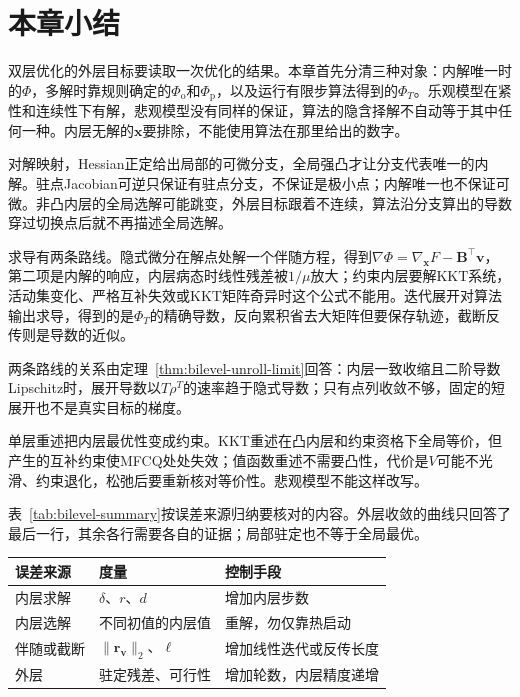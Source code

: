 \section{本章小结}
\label{sec:bilevel-summary}

双层优化的外层目标要读取一次优化的结果。本章首先分清三种对象：内解唯一时的$\Phi$，多解时靠规则确定的$\Phi_{\mathrm{o}}$和$\Phi_{\mathrm{p}}$，以及运行有限步算法得到的$\Phi_T$。乐观模型在紧性和连续性下有解，悲观模型没有同样的保证，算法的隐含择解不自动等于其中任何一种。内层无解的$\bm{x}$要排除，不能使用算法在那里给出的数字。

对解映射，Hessian正定给出局部的可微分支，全局强凸才让分支代表唯一的内解。驻点Jacobian可逆只保证有驻点分支，不保证是极小点；内解唯一也不保证可微。非凸内层的全局选解可能跳变，外层目标跟着不连续，算法沿分支算出的导数穿过切换点后就不再描述全局选解。

求导有两条路线。隐式微分在解点处解一个伴随方程，得到$\nabla\Phi=\nabla_{\bm{x}}F-\bm{B}^{\top}\bm{v}$，第二项是内解的响应，内层病态时线性残差被$1/\mu$放大；约束内层要解KKT系统，活动集变化、严格互补失效或KKT矩阵奇异时这个公式不能用。迭代展开对算法输出求导，得到的是$\Phi_T$的精确导数，反向累积省去大矩阵但要保存轨迹，截断反传则是导数的近似。

两条路线的关系由定理~\ref{thm:bilevel-unroll-limit}回答：内层一致收缩且二阶导数Lipschitz时，展开导数以$T\rho^T$的速率趋于隐式导数；只有点列收敛不够，固定的短展开也不是真实目标的梯度。

单层重述把内层最优性变成约束。KKT重述在凸内层和约束资格下全局等价，但产生的互补约束使MFCQ处处失效；值函数重述不需要凸性，代价是$V$可能不光滑、约束退化，松弛后要重新核对等价性。悲观模型不能这样改写。

表~\ref{tab:bilevel-summary}按误差来源归纳要核对的内容。外层收敛的曲线只回答了最后一行，其余各行需要各自的证据；局部驻定也不等于全局最优。

\begin{BookInlineTable}
 \centering
 \begin{tabular}{lll}
  \toprule
  误差来源 & 度量 & 控制手段\\
  \midrule
  内层求解 & $\delta$、$r$、$d$ & 增加内层步数\\
  内层选解 & 不同初值的内层值 & 重解，勿仅靠热启动\\
  伴随或截断 & $\lVert\bm{r}_{\bm{v}}\rVert_2$、$\ell$ & 增加线性迭代或反传长度\\
  外层 & 驻定残差、可行性 & 增加轮数，内层精度递增\\
  \bottomrule
 \end{tabular}
 \caption{双层求解中需要分别核对的四类误差。}
 \label{tab:bilevel-summary}
\end{BookInlineTable}
